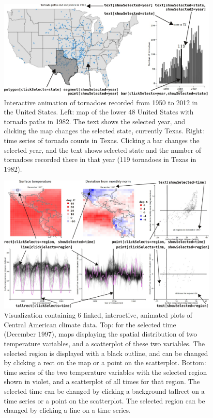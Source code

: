\documentclass[12pt,]{article}
\theoremstyle{definition}
\theoremstyle{definition}
\theoremstyle{remark}
\begin{document}
\begin{figure}
\centering
\includegraphics{images/figure-tornado.pdf}
\caption{\label{fig:tornado}Interactive animation of tornadoes recorded from
1950 to 2012 in the United States. Left: map of the lower 48 United
States with tornado paths in 1982. The text shows the selected year, and
clicking the map changes the selected state, currently Texas. Right:
time series of tornado counts in Texas. Clicking a bar changes the
selected year, and the text shows selected state and the number of
tornadoes recorded there in that year (119 tornadoes in Texas in 1982).}
\end{figure}

\begin{figure}
\centering
\includegraphics{images/figure-climate.pdf}
\caption{\label{fig:climate}Visualization containing 6 linked, interactive,
animated plots of Central American climate data. Top: for the selected
time (December 1997), maps displaying the spatial distribution of two
temperature variables, and a scatterplot of these two variables. The
selected region is displayed with a black outline, and can be changed by
clicking a rect on the map or a point on the scatterplot. Bottom: time
series of the two temperature variables with the selected region shown
in violet, and a scatterplot of all times for that region. The selected
time can be changed by clicking a background tallrect on a time series
or a point on the scatterplot. The selected region can be changed by
clicking a line on a time series.}
\end{figure}
\end{document}
